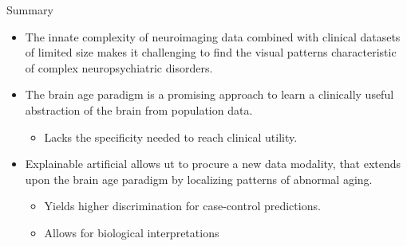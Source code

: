 \documentclass{beamer}
\begin{document}
    \begin{frame}[t]{Summary}
        \setlength\itemsep{0.05em}
        \begin{itemize}
            \item The innate complexity of neuroimaging data combined with clinical datasets of limited size makes it challenging to find the visual patterns characteristic of complex neuropsychiatric disorders.
            \item The brain age paradigm is a promising approach to learn a clinically useful abstraction of the brain from population data.
            \begin{itemize}
                \setlength\itemsep{0.1em}
                \item Lacks the specificity needed to reach clinical utility.
            \end{itemize}
            \item Explainable artificial allows ut to procure a new data modality, that extends upon the brain age paradigm by localizing patterns of abnormal aging.
            \begin{itemize}
                \setlength\itemsep{0.1em}
                \item Yields higher discrimination for case-control predictions.
                \item Allows for biological interpretations
            \end{itemize}
        \end{itemize}
    \end{frame}
\end{document}
